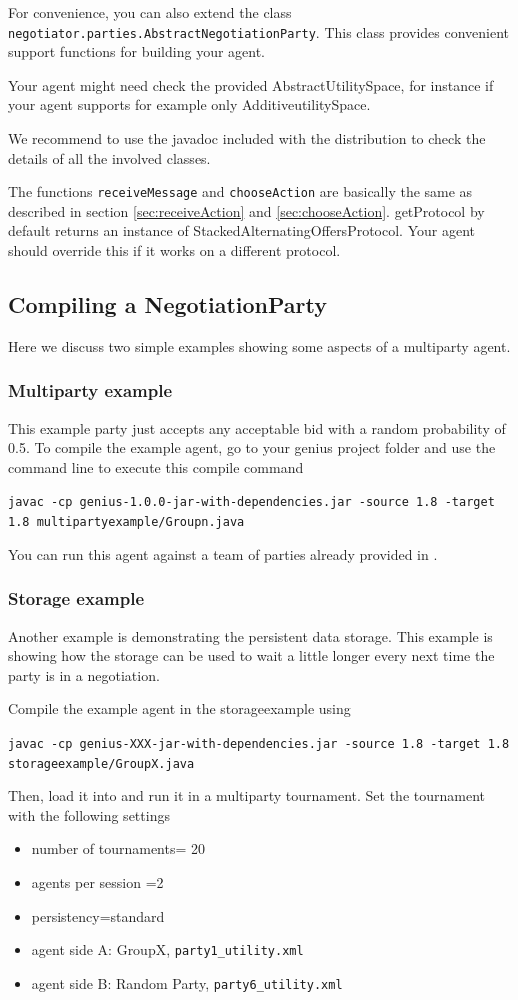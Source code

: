 \documentclass[]{article}
\begin{document}
For convenience, you can also extend the class \texttt{negotiator.parties.AbstractNegotiationParty}. This class provides convenient support functions for building your agent. 

Your agent might need check the provided AbstractUtilitySpace, for instance if your agent supports for example only AdditiveutilitySpace.

We recommend to use the javadoc included with the distribution to check the details of all the involved classes. 

The functions \verb|receiveMessage| and \verb|chooseAction| are basically the same as described in section \ref{sec:receiveAction} and \ref{sec:chooseAction}. getProtocol by default returns an instance of StackedAlternatingOffersProtocol. Your agent should override this if it works on a different protocol.

\subsection{Compiling a NegotiationParty}
Here we discuss two simple examples showing some aspects of a multiparty agent.

\subsubsection{Multiparty example}
This example party just accepts any acceptable bid with a random probability of 0.5. To compile the example agent, go to your genius project folder and use the command line to execute this compile command

\verb|javac -cp genius-1.0.0-jar-with-dependencies.jar -source 1.8 -target 1.8 multipartyexample/Groupn.java|

You can run this agent against a team of parties already provided in \Genius.

\subsubsection{Storage example}
Another example is demonstrating the persistent data storage. This example is showing how the storage can be used to wait a little longer every next time the party is in a negotiation.

Compile the example agent in the storageexample using

\verb|javac -cp genius-XXX-jar-with-dependencies.jar -source 1.8 -target 1.8 storageexample/GroupX.java|

Then, load it into \Genius and run it in a multiparty tournament. Set the tournament with the following settings
\begin{itemize}
\item  number of tournaments= 20
\item   agents per session =2
\item  persistency=standard
\item  agent side A: GroupX, \verb|party1_utility.xml|
\item  agent side B: Random Party, \verb|party6_utility.xml|
\end{itemize}
\end{document}
